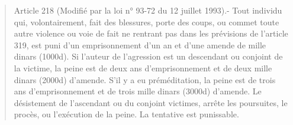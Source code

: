 \begin{quote}\small Article 218 (Modifié par la loi n° 93-72 du 12 juillet 1993).- Tout individu qui, volontairement, fait des blessures, porte des coups, ou commet toute autre violence ou voie de fait ne rentrant pas dans les prévisions de l'article 319, est puni d'un emprisonnement d'un an et d'une amende de mille dinars (1000d). Si l'auteur de l'agression est un descendant ou conjoint de la victime, la peine est de deux ans d'emprisonnement et de deux mille dinars (2000d) d'amende. S'il y a eu préméditation, la peine est de trois ans d'emprisonnement et de trois mille dinars (3000d) d'amende. Le désistement de l'ascendant ou du conjoint victimes, arrête les poursuites, le procès, ou l'exécution de la peine. La tentative est punissable.\end{quote}